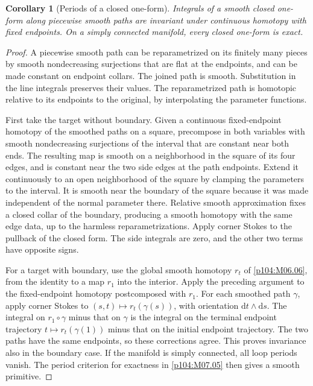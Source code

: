 \documentclass[11pt,oneside,openany]{book}
\newtheorem{corollary}[theorem]{Corollary}
\theoremstyle{definition}
\theoremstyle{remark}
\newcommand{\dd}{\mathrm d}
\begin{document}
\begin{corollary}[Periods of a closed one-form]
\label{p104:M10.07}
Integrals of a smooth closed one-form along piecewise smooth paths
are invariant under continuous homotopy with fixed endpoints. On
a simply connected manifold, every closed one-form is exact.
\end{corollary}
\begin{proof}
A piecewise smooth path can be reparametrized on its finitely
many pieces by smooth nondecreasing surjections that are flat at
the endpoints, and can be made constant on endpoint collars.
The joined path is smooth. Substitution in the line integrals
preserves their values. The reparametrized path is homotopic
relative to its endpoints to the original, by interpolating the
parameter functions.

First take the target without boundary. Given a continuous
fixed-endpoint homotopy of the smoothed paths on a square,
precompose in both variables with smooth nondecreasing
surjections of the interval that are constant near both
ends. The resulting map is smooth on a neighborhood in the
square of its four edges, and is constant near the two
side edges at the path endpoints. Extend it continuously to
an open neighborhood of the square by clamping the
parameters to the interval. It is smooth near the boundary
of the square because it was made independent of the
normal parameter there. Relative smooth approximation fixes
a closed collar of the boundary, producing a smooth
homotopy with the same edge data, up to the harmless
reparametrizations. Apply corner Stokes to the pullback
of the closed form. The side integrals are zero, and the
other two terms have opposite signs.

For a target with boundary, use the global smooth homotopy
\(r_t\) of \cref{p104:M06.06}, from the identity to a map
\(r_1\) into the interior. Apply the preceding argument to
the fixed-endpoint homotopy postcomposed with \(r_1\).
For each smoothed path \(\gamma\), apply corner Stokes
to \((s,t)\mapsto r_t(\gamma(s))\), with orientation
\(\dd t\wedge\dd s\). The integral on \(r_1\circ\gamma\)
minus that on \(\gamma\) is the integral on the terminal
endpoint trajectory \(t\mapsto r_t(\gamma(1))\) minus that
on the initial endpoint trajectory. The two paths have
the same endpoints, so these corrections agree. This
proves invariance also in the boundary case. If the manifold is
simply connected, all loop periods vanish. The period
criterion for exactness in \cref{p104:M07.05} then gives
a smooth primitive.
\end{proof}
\end{document}
